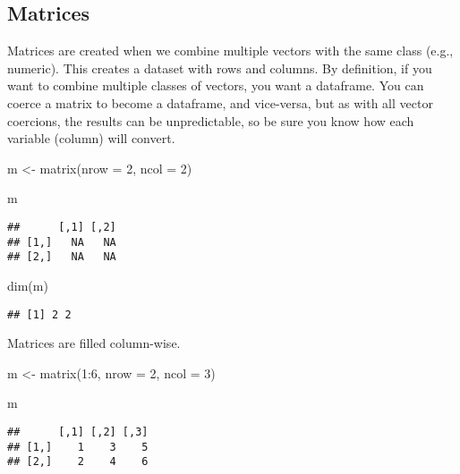 \documentclass[
]{book}
\newenvironment{Shaded}{\begin{snugshade}}{\end{snugshade}}
\newcommand{\AttributeTok}[1]{\textcolor[rgb]{0.77,0.63,0.00}{#1}}
\newcommand{\DecValTok}[1]{\textcolor[rgb]{0.00,0.00,0.81}{#1}}
\newcommand{\FunctionTok}[1]{\textcolor[rgb]{0.00,0.00,0.00}{#1}}
\newcommand{\NormalTok}[1]{#1}
\newcommand{\OtherTok}[1]{\textcolor[rgb]{0.56,0.35,0.01}{#1}}
\newcommand{\SpecialCharTok}[1]{\textcolor[rgb]{0.00,0.00,0.00}{#1}}
\begin{document}
\hypertarget{matrices}{%
\subsection{Matrices}\label{matrices}}

Matrices are created when we combine multiple vectors with the same class (e.g., numeric). This creates a dataset with rows and columns. By definition, if you want to combine multiple classes of vectors, you want a dataframe. You can coerce a matrix to become a dataframe, and vice-versa, but as with all vector coercions, the results can be unpredictable, so be sure you know how each variable (column) will convert.

\begin{Shaded}
\begin{Highlighting}[]
\NormalTok{m }\OtherTok{\textless{}{-}} \FunctionTok{matrix}\NormalTok{(}\AttributeTok{nrow =} \DecValTok{2}\NormalTok{, }\AttributeTok{ncol =} \DecValTok{2}\NormalTok{)}

\NormalTok{m}
\end{Highlighting}
\end{Shaded}

\begin{verbatim}
##      [,1] [,2]
## [1,]   NA   NA
## [2,]   NA   NA
\end{verbatim}

\begin{Shaded}
\begin{Highlighting}[]
\FunctionTok{dim}\NormalTok{(m)}
\end{Highlighting}
\end{Shaded}

\begin{verbatim}
## [1] 2 2
\end{verbatim}

Matrices are filled column-wise.

\begin{Shaded}
\begin{Highlighting}[]
\NormalTok{m }\OtherTok{\textless{}{-}} \FunctionTok{matrix}\NormalTok{(}\DecValTok{1}\SpecialCharTok{:}\DecValTok{6}\NormalTok{, }\AttributeTok{nrow =} \DecValTok{2}\NormalTok{, }\AttributeTok{ncol =} \DecValTok{3}\NormalTok{)}

\NormalTok{m}
\end{Highlighting}
\end{Shaded}

\begin{verbatim}
##      [,1] [,2] [,3]
## [1,]    1    3    5
## [2,]    2    4    6
\end{verbatim}
\end{document}
